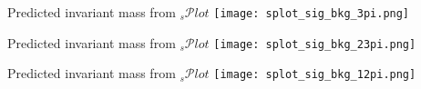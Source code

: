 \documentclass[12pt]{beamer}
\begin{document}

\begin{frame}{Predicted invariant mass from ${}_s\mathcal{P}\textit{lot}$}                                                                           
	\texttt{[image: splot\_sig\_bkg\_3pi.png]}
\end{frame}

\begin{frame}{Predicted invariant mass from ${}_s\mathcal{P}\textit{lot}$}                                                                           
	\texttt{[image: splot\_sig\_bkg\_23pi.png]}
\end{frame}

\begin{frame}{Predicted invariant mass from ${}_s\mathcal{P}\textit{lot}$}                                                                           
	\texttt{[image: splot\_sig\_bkg\_12pi.png]}
\end{frame}
\end{document}
